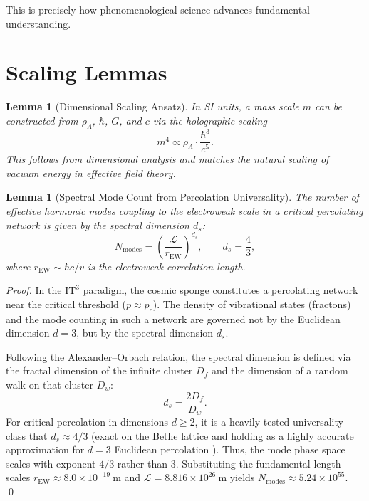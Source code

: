 \documentclass[11pt,a4paper]{article}
\newtheorem{lemma}[theorem]{Lemma}
\newcommand{\ITthree}{\ensuremath{\mathrm{IT}^3}}
\newcommand{\Ltop}{\ensuremath{\mathcal{L}}}
\newcommand{\rhoLambda}{\ensuremath{\rho_\Lambda}}
\newcommand{\Nmodes}{\ensuremath{N_{\mathrm{modes}}}}
\begin{document}
This is precisely how phenomenological science advances fundamental understanding.

\section{Scaling Lemmas}
\label{sec:lemmas}

\begin{lemma}[Dimensional Scaling Ansatz]
\label{lem:dimensions}
In SI units, a mass scale $m$ can be constructed from $\rhoLambda$, $\hbar$, $G$, 
and $c$ via the holographic scaling
\begin{equation}
m^4 \propto \rhoLambda \cdot \frac{\hbar^3}{c^5}.
\label{eq:dim}
\end{equation}
This follows from dimensional analysis and matches the natural scaling of 
vacuum energy in effective field theory.
\end{lemma}

\begin{lemma}[Spectral Mode Count from Percolation Universality]
\label{lem:modes}
The number of effective harmonic modes coupling to the electroweak scale in a 
critical percolating network is given by the spectral dimension $d_s$:
\begin{equation}
\Nmodes = \left(\frac{\Ltop}{r_{\mathrm{EW}}}\right)^{d_s}, \qquad d_s = \frac{4}{3},
\label{eq:Nmodes}
\end{equation}
where $r_{\mathrm{EW}} \sim \hbar c / v$ is the electroweak correlation length.
\end{lemma}

\begin{proof}
In the $\ITthree$ paradigm, the cosmic sponge constitutes a percolating network 
near the critical threshold ($p \approx p_c$). The density of vibrational states 
(fractons) and the mode counting in such a network are governed not by the 
Euclidean dimension $d=3$, but by the spectral dimension $d_s$.

Following the Alexander--Orbach relation, the spectral dimension is defined via 
the fractal dimension of the infinite cluster $D_f$ and the dimension of a 
random walk on that cluster $D_w$:
\[
d_s = \frac{2 D_f}{D_w}.
\]
For critical percolation in dimensions $d \ge 2$, it is a heavily tested 
universality class that $d_s \approx 4/3$ (exact on the Bethe lattice and 
holding as a highly accurate approximation for $d=3$ Euclidean percolation 
\citep{Alexander1982, Stauffer1994}). Thus, the mode phase space scales with 
exponent $4/3$ rather than $3$. Substituting the fundamental length scales 
$r_{\mathrm{EW}} \approx 8.0 \times 10^{-19}~\mathrm{m}$ and 
$\Ltop = 8.816 \times 10^{26}~\mathrm{m}$ yields 
$\Nmodes \approx 5.24 \times 10^{55}$. \qed
\end{proof}
\end{document}
